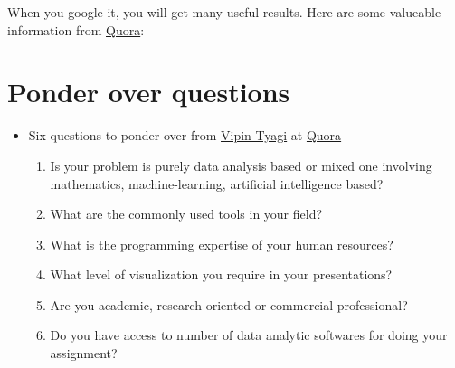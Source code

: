 \documentclass[letterpaper,11pt,english]{sphinxmanual}
\begin{document}
When you google it, you will get many useful results. Here are some valueable information from \href{https://www.quora.com/Which-is-better-for-data-analysis-R-or-Python}{Quora}:


\section{Ponder over questions}
\label{comparison:ponder-over-questions}\begin{itemize}
\item {} 
Six questions to ponder over from  \href{https://www.quora.com/profile/Vipin-Tyagi-9}{Vipin Tyagi} at \href{https://www.quora.com/Which-is-better-for-data-analysis-R-or-Python}{Quora}
\begin{enumerate}
\item {} 
Is your problem is purely data analysis based or mixed one involving mathematics, machine-learning, artificial intelligence based?

\item {} 
What are the commonly used tools in your field?

\item {} 
What is the programming expertise of your human resources?

\item {} 
What level of visualization you require in your presentations?

\item {} 
Are you academic, research-oriented or commercial professional?

\item {} 
Do you have access to number of data analytic softwares for doing your assignment?

\end{enumerate}

\end{itemize}
\end{document}
